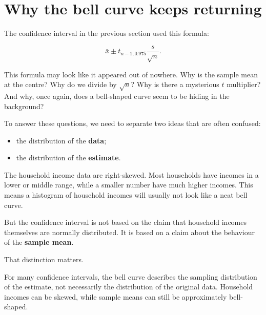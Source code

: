 \documentclass[
  letterpaper,
  DIV=11,
  numbers=noendperiod]{scrreprt}
\providecommand{\tightlist}{%
  \setlength{\itemsep}{0pt}\setlength{\parskip}{0pt}}
\begin{document}
\section{Why the bell curve keeps
returning}\label{why-the-bell-curve-keeps-returning}

The confidence interval in the previous section used this formula:

\[
\bar{x}
\pm
t_{n-1,0.975}
\frac{s}{\sqrt{n}}.
\]

This formula may look like it appeared out of nowhere. Why is the sample
mean at the centre? Why do we divide by \(\sqrt{n}\)? Why is there a
mysterious \(t\) multiplier? And why, once again, does a bell-shaped
curve seem to be hiding in the background?

To answer these questions, we need to separate two ideas that are often
confused:

\begin{itemize}
\tightlist
\item
  the distribution of the \textbf{data};
\item
  the distribution of the \textbf{estimate}.
\end{itemize}

The household income data are right-skewed. Most households have incomes
in a lower or middle range, while a smaller number have much higher
incomes. This means a histogram of household incomes will usually not
look like a neat bell curve.

But the confidence interval is not based on the claim that household
incomes themselves are normally distributed. It is based on a claim
about the behaviour of the \textbf{sample mean}.

That distinction matters.

\begin{tcolorbox}[enhanced jigsaw, arc=.35mm, bottomrule=.15mm, bottomtitle=1mm, breakable, colback=white, colbacktitle=quarto-callout-important-color!10!white, colframe=quarto-callout-important-color-frame, coltitle=black, left=2mm, leftrule=.75mm, opacityback=0, opacitybacktitle=0.6, rightrule=.15mm, title=\textcolor{quarto-callout-important-color}{\faExclamation}\hspace{0.5em}{The bell curve does not need to describe the data}, titlerule=0mm, toprule=.15mm, toptitle=1mm]

For many confidence intervals, the bell curve describes the sampling
distribution of the estimate, not necessarily the distribution of the
original data. Household incomes can be skewed, while sample means can
still be approximately bell-shaped.

\end{tcolorbox}
\end{document}

